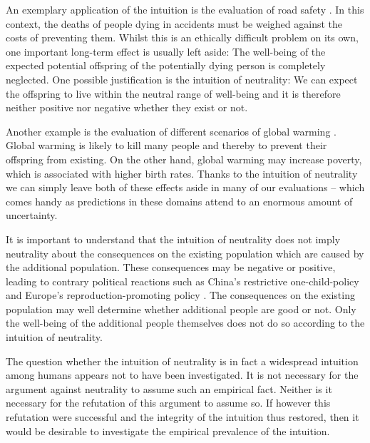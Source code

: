 An exemplary application of the intuition is the evaluation of road safety \cite[p.~144f]{broome_2004}. In this context, the deaths of people dying in accidents must be weighed against the costs of preventing them. Whilst this is an ethically difficult problem on its own, one important long-term effect is usually left aside: The well-being of the expected potential offspring of the potentially dying person is completely neglected. One possible justification is the intuition of neutrality: We can expect the offspring to live within the neutral range of well-being and it is therefore neither positive nor negative whether they exist or not.  

Another example is the evaluation of different scenarios of global warming \cite[p.~170]{broome_2012}. Global warming is likely to kill many people and thereby to prevent their offspring from existing. On the other hand, global warming may increase poverty, which is associated with higher birth rates. Thanks to the intuition of neutrality we can simply leave both of these effects aside in many of our evaluations – which comes handy as predictions in these domains attend to an enormous amount of uncertainty.  

It is important to understand that the intuition of neutrality does not imply neutrality about the consequences on the existing population which are caused by the additional population. These consequences may be negative or positive, leading to contrary political reactions such as China’s restrictive one-child-policy and Europe’s reproduction-promoting policy \cite[p.~169]{broome_2012}. The consequences on the existing population may well determine whether additional people are good or not. Only the well-being of the additional people themselves does not do so according to the intuition of neutrality.  

The question whether the intuition of neutrality is in fact a widespread intuition among humans appears not to have been investigated. It is not necessary for the argument against neutrality to assume such an empirical fact. Neither is it necessary for the refutation of this argument to assume so. If however this refutation were successful and the integrity of the intuition thus restored, then it would be desirable to investigate the empirical prevalence of the intuition.  